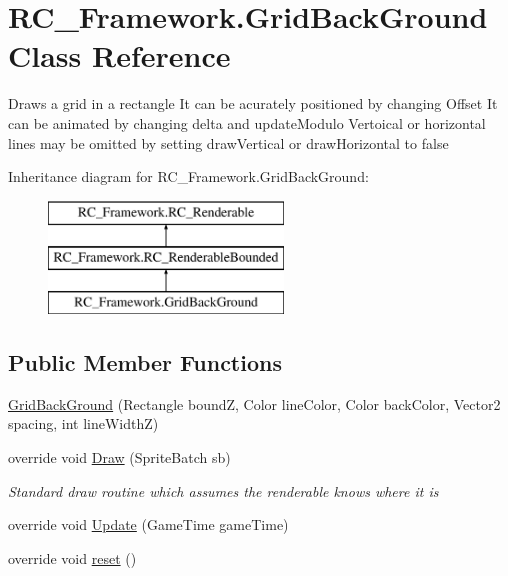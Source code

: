 \hypertarget{class_r_c___framework_1_1_grid_back_ground}{}\section{R\+C\+\_\+\+Framework.\+Grid\+Back\+Ground Class Reference}
\label{class_r_c___framework_1_1_grid_back_ground}


Draws a grid in a rectangle It can be acurately positioned by changing Offset It can be animated by changing delta and update\+Modulo Vertoical or horizontal lines may be omitted by setting draw\+Vertical or draw\+Horizontal to false  


Inheritance diagram for R\+C\+\_\+\+Framework.\+Grid\+Back\+Ground\+:\begin{figure}[H]
\begin{center}
\leavevmode
\includegraphics[height=3.000000cm]{class_r_c___framework_1_1_grid_back_ground}
\end{center}
\end{figure}
\subsection*{Public Member Functions}
\begin{DoxyCompactItemize}
\item 
\mbox{\hyperlink{class_r_c___framework_1_1_grid_back_ground_ac58b15afcc3b7fddc9aaa0f8decd3d7c}{Grid\+Back\+Ground}} (Rectangle boundZ, Color line\+Color, Color back\+Color, Vector2 spacing, int line\+WidthZ)
\item 
override void \mbox{\hyperlink{class_r_c___framework_1_1_grid_back_ground_a242904271618f793025f4dfae9681c13}{Draw}} (Sprite\+Batch sb)
\begin{DoxyCompactList}\small\item\em Standard draw routine which assumes the renderable knows where it is \end{DoxyCompactList}\item 
override void \mbox{\hyperlink{class_r_c___framework_1_1_grid_back_ground_af43061e6a0067ad6c3043b6ddb080de4}{Update}} (Game\+Time game\+Time)
\item 
override void \mbox{\hyperlink{class_r_c___framework_1_1_grid_back_ground_aeaa4759b7da2f73fd760f0e9d59aa97c}{reset}} ()
\end{DoxyCompactItemize}
